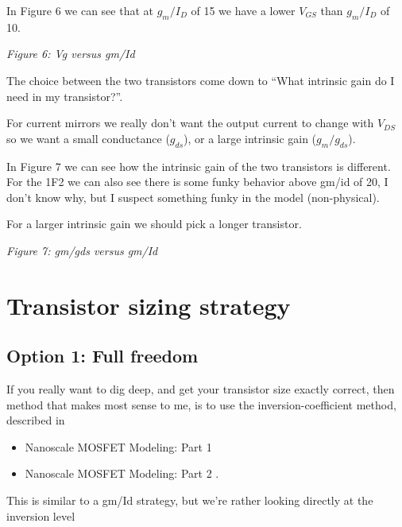 In Figure 6 we can see that at \(g_m/I_D\) of 15 we have a lower
\(V_{GS}\) than \(g_m/I_D\) of 10.


{
\centering
{}
}

\emph{Figure 6: Vg versus gm/Id }

The choice between the two transistors come down to ``What intrinsic
gain do I need in my transistor?''.

For current mirrors we really don't want the output current to change
with \(V_{DS}\) so we want a small conductance (\(g_{ds}\)), or a large
intrinsic gain (\(g_m/g_{ds}\)).

In Figure 7 we can see how the intrinsic gain of the two transistors is
different. For the 1F2 we can also see there is some funky behavior
above gm/id of 20, I don't know why, but I suspect something funky in
the model (non-physical).

For a larger intrinsic gain we should pick a longer transistor.


{
\centering
{}
}

\emph{Figure 7: gm/gds versus gm/Id }

\section{Transistor sizing strategy}\label{transistor-sizing-strategy}

\subsection{Option 1: Full freedom}\label{option-1-full-freedom}

If you really want to dig deep, and get your transistor size exactly
correct, then method that makes most sense to me, is to use the
inversion-coefficient method, described in

\begin{itemize}
\tightlist
\item
  Nanoscale MOSFET Modeling: Part 1 
\item
  Nanoscale MOSFET Modeling: Part 2 .
\end{itemize}

This is similar to a gm/Id strategy, but we're rather looking directly
at the inversion level

